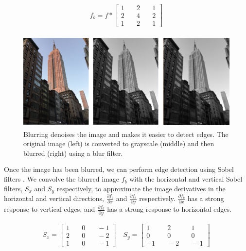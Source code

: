 \documentclass[runningheads]{llncs}
\begin{document}
\begin{align}
f_b = f * \begin{bmatrix} 
1 & \quad 2 & \quad 1 \\ 
2 & \quad 4 & \quad 2 \\ 
1 & \quad 2 & \quad 1  
\end{bmatrix}
\end{align}

\begin{figure}
\centering
\includegraphics[height=5cm]{images/blur.png}
\caption{Blurring denoises the image and makes it easier to detect edges. The original image (left) is converted to grayscale (middle) and then blurred (right) using a blur filter.}
\label{fig:example}
\end{figure}

Once the image has been blurred, we can perform edge detection using Sobel filters \cite{sobel}. We convolve the blurred image $f_b$ with the horizontal and vertical Sobel filters, $S_x$ and $S_y$ respectively, to approximate the image derivatives in the horizontal and vertical directions, $\frac{\partial f_b}{\partial x}$ and $\frac{\partial f_b}{\partial y}$ respectively. $\frac{\partial f_b}{\partial x}$ has a strong response to vertical edges, and $\frac{\partial f_b}{\partial y}$ has a strong response to horizontal edges.

\begin{align}
S_x = \begin{bmatrix} 
1 & \quad 0 & \quad -1 \\ 
2 & \quad 0 & \quad -2 \\ 
1 & \quad 0 & \quad -1  
\end{bmatrix}
\quad S_y = \begin{bmatrix} 
1 & \quad 2 & \quad 1 \\ 
0 & \quad 0 & \quad 0 \\ 
-1 & \quad -2 & \quad -1  
\end{bmatrix}
\end{align}
\end{document}
